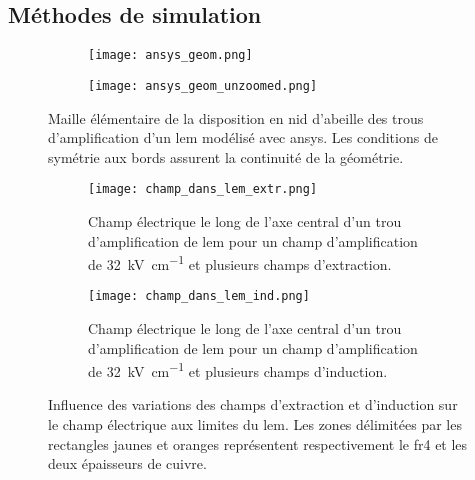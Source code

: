         \subsection{Méthodes de simulation}
        
            \begin{figure}[htpb]
                \begin{subfigure}[t]{0.48\textwidth}
                    \texttt{[image: ansys\_geom.png]}
                \end{subfigure}
                \hfill
                \begin{subfigure}[t]{0.48\textwidth}
                    \texttt{[image: ansys\_geom\_unzoomed.png]}
                \end{subfigure}
                \caption{Maille élémentaire de la disposition en nid d'abeille des trous d'amplification d'un \gls{lem} modélisé avec \gls{ansys}. Les conditions de symétrie aux bords assurent la continuité de la géométrie.}
                \label{fig::ansys_geom}
            \end{figure}
            
            \begin{figure}[htpb]
                \begin{subfigure}[t]{0.48\textwidth}
                    \texttt{[image: champ\_dans\_lem\_extr.png]}
                    \caption{Champ électrique le long de l'axe central d'un trou d'amplification de \gls{lem} pour un champ d'amplification de \SI{32}{\kilo\volt\per\centi\meter} et plusieurs champs d'extraction.}
                    \label{fig::champ_dans_lem_extr}
                \end{subfigure}
                \hfill
                \begin{subfigure}[t]{0.48\textwidth}
                    \texttt{[image: champ\_dans\_lem\_ind.png]}
                    \caption{Champ électrique le long de l'axe central d'un trou d'amplification de \gls{lem} pour un champ d'amplification de \SI{32}{\kilo\volt\per\centi\meter} et plusieurs champs d'induction.}
                    \label{fig::champ_dans_lem_ind}
                \end{subfigure}
                \caption[Influence des variations des champs d'extraction et d'induction sur le champ électrique aux limites du \gls{lem}.]{Influence des variations des champs d'extraction et d'induction sur le champ électrique aux limites du \gls{lem}. Les zones délimitées par les rectangles jaunes et oranges représentent respectivement le \gls{fr4} et les deux épaisseurs de cuivre.}
                \label{fig::champ_dans_lem}
            \end{figure}
        
